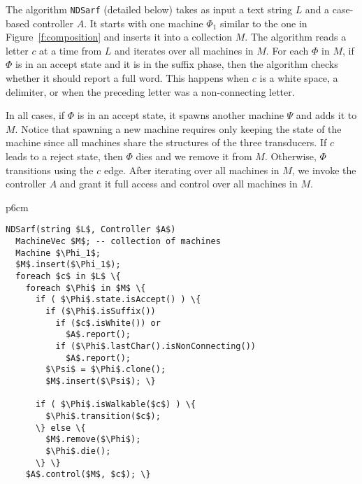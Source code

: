 \documentclass[11pt]{article}
\newcommand{\CodeIn}[1]{{\small\texttt{#1}}}
\begin{document}
\begin{figure}[tb]
\end{figure}

The algorithm \CodeIn{NDSarf} (detailed below)
takes as input a text string $L$ and a case-based controller
$A$. 
It starts with one machine $\Phi_1$ similar to the one in 
Figure~\ref{f:composition} and inserts it into a collection
$M$. 
The algorithm reads a letter $c$ at a time from $L$
and iterates over all machines in $M$. 
For each $\Phi$ in $M$,
if $\Phi$ is in an accept state and it is in the suffix
phase, then the algorithm checks whether it should report
a full word. 
This happens when $c$ is a white space, a delimiter, 
or when the preceding letter %
was a non-connecting letter. 

In all cases, if $\Phi$ is in an accept state, 
it spawns another machine $\Psi$ and adds it to $M$. 
Notice that spawning a new machine requires only keeping
the state of the machine since all machines share the
structures of the three transducers.
If $c$ leads to a reject state, then $\Phi$ dies 
and we remove it from $M$. 
Otherwise, $\Phi$ transitions using the $c$ edge.
After iterating over all machines in $M$, we invoke the 
controller $A$
and grant it full access and control over
all machines in $M$. 


\begin{table}[tb]
\begin{tabular} {p{6cm}}
\begin{Verbatim}[fontsize=\relsize{-2},
frame=topline,framesep=4mm,label=\fbox{NDSarf algorithm},
commandchars=\\\{\}, codes={\catcode`$=3\catcode`_=8}]
NDSarf(string $L$, Controller $A$) 
  MachineVec $M$; -- collection of machines
  Machine $\Phi_1$;
  $M$.insert($\Phi_1$);
  foreach $c$ in $L$ \{
    foreach $\Phi$ in $M$ \{
      if ( $\Phi$.state.isAccept() ) \{
        if ($\Phi$.isSuffix())
          if ($c$.isWhite()) or 
            $A$.report();
          if ($\Phi$.lastChar().isNonConnecting())
            $A$.report();
        $\Psi$ = $\Phi$.clone();
        $M$.insert($\Psi$); \}

      if ( $\Phi$.isWalkable($c$) ) \{
        $\Phi$.transition($c$);
      \} else \{
        $M$.remove($\Phi$);
        $\Phi$.die();
      \} \} 
    $A$.control($M$, $c$); \}
\end{Verbatim}
\end{tabular}
\label{a:ndsarf}
\end{table}
\end{document}
